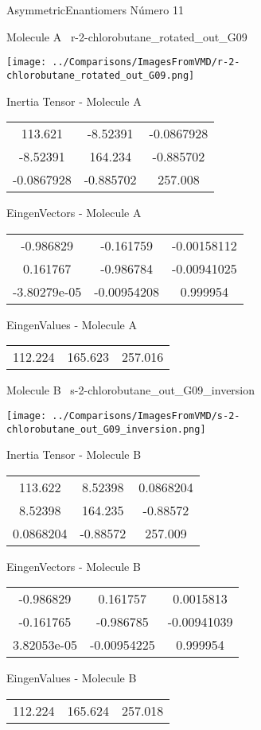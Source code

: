 \vtab[-3cm]
\begin{center}
{\large AsymmetricEnantiomers \tab Número 11}
\end{center}
\begin{multicols}{2}
\begin{center}

Molecule A \
r-2-chlorobutane\_rotated\_out\_G09

\texttt{[image: ../Comparisons/ImagesFromVMD/r-2-chlorobutane\_rotated\_out\_G09.png]}

Inertia Tensor - Molecule A \\
\begin{tabular}{|c c c|}
113.621	 & 	-8.52391	 & 	-0.0867928	 \\
-8.52391	 & 	164.234	 & 	-0.885702	 \\
-0.0867928	 & 	-0.885702	 & 	257.008
\end{tabular}

\vtab
 EingenVectors - Molecule A     \\
\begin{tabular}{|c c c|}
-0.986829	 & 	-0.161759	 & 	-0.00158112	 \\
0.161767	 & 	-0.986784	 & 	-0.00941025	 \\
-3.80279e-05	 & 	-0.00954208	 & 	0.999954
\end{tabular}

\vtab
 EingenValues - Molecule A     \\
\begin{tabular}{|c c c|}
112.224	 & 	165.623	 & 	257.016	 \\
\end{tabular}
\columnbreak

Molecule B \
s-2-chlorobutane\_out\_G09\_inversion

\texttt{[image: ../Comparisons/ImagesFromVMD/s-2-chlorobutane\_out\_G09\_inversion.png]}

Inertia Tensor - Molecule B \\
\begin{tabular}{|c c c|}
113.622	 & 	8.52398	 & 	0.0868204	 \\
8.52398	 & 	164.235	 & 	-0.88572	 \\
0.0868204	 & 	-0.88572	 & 	257.009
\end{tabular}

\vtab
 EingenVectors - Molecule B     \\
\begin{tabular}{|c c c|}
-0.986829	 & 	0.161757	 & 	0.0015813	 \\
-0.161765	 & 	-0.986785	 & 	-0.00941039	 \\
3.82053e-05	 & 	-0.00954225	 & 	0.999954
\end{tabular}

\vtab
 EingenValues - Molecule B     \\
\begin{tabular}{|c c c|}
112.224	 & 	165.624	 & 	257.018	 \\
\end{tabular}

\end{center}
\end{multicols}

